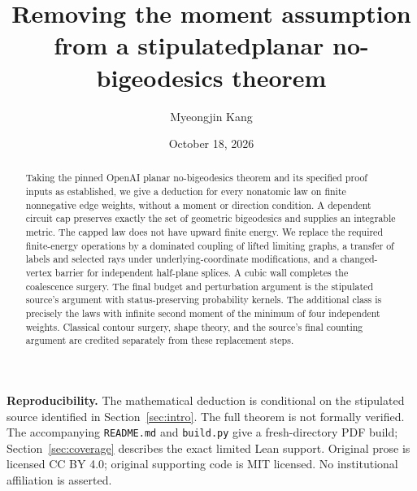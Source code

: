 \documentclass[11pt]{article}
\title{Removing the moment assumption from a stipulated\newline planar no-bigeodesics theorem}
\author{Myeongjin Kang}
\date{October 18, 2026}
\theoremstyle{definition}\newtheorem{definition}[theorem]{Definition}
\theoremstyle{remark}\newtheorem{remark}[theorem]{Remark}
\begin{document}
\maketitle
\begin{abstract}
Taking the pinned OpenAI planar no-bigeodesics theorem and its specified proof
inputs as established, we give a deduction for every nonatomic law on finite
nonnegative edge weights, without a moment or direction condition. A dependent
circuit cap preserves exactly the set of geometric bigeodesics and supplies
an integrable metric. The capped law does not have upward finite energy.
We replace the required finite-energy operations by a dominated coupling of
lifted limiting graphs, a transfer of labels and selected rays under
underlying-coordinate modifications, and a changed-vertex barrier for
independent half-plane splices. A cubic wall completes the coalescence surgery.
The final budget and perturbation argument is the stipulated source's argument
with status-preserving probability kernels. The additional class is precisely
the laws with infinite second moment of the minimum of four independent
weights. Classical contour surgery, shape theory, and the source's final
counting argument are credited separately from these replacement steps.
\end{abstract}
\noindent\textbf{Reproducibility.} The mathematical deduction is conditional on the stipulated source identified
in Section~\ref{sec:intro}. The full theorem is not formally verified.
The accompanying \texttt{README.md} and \texttt{build.py} give a fresh-directory
PDF build; Section~\ref{sec:coverage} describes the exact limited Lean support.
Original prose is licensed CC BY 4.0; original supporting code is MIT licensed.
No institutional affiliation is asserted.
\tableofcontents









\end{document}

